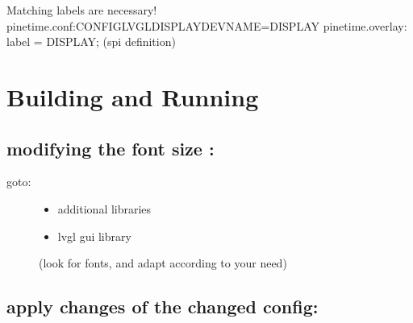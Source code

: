 \documentclass[letterpaper,10pt,english]{sphinxmanual}
\begin{document}

\begin{sphinxVerbatim}[commandchars=\\\{\}]
Matching labels are necessary!
pinetime.conf:CONFIG\PYGZus{}LVGL\PYGZus{}DISPLAY\PYGZus{}DEV\PYGZus{}NAME=\PYGZdq{}DISPLAY\PYGZdq{}
pinetime.overlay:               label = \PYGZdq{}DISPLAY\PYGZdq{}; (spi definition)
\end{sphinxVerbatim}


\section{Building and Running}
\label{\detokenize{lvgl:building-and-running}}
\begin{sphinxVerbatim}[commandchars=\\\{\}]
\end{sphinxVerbatim}


\subsection{modifying the font size :}
\label{\detokenize{lvgl:modifying-the-font-size}}
\begin{sphinxVerbatim}[commandchars=\\\{\}]
\end{sphinxVerbatim}
\begin{description}
\item[{goto:}] \leavevmode\begin{itemize}
\item {} 
additional libraries

\item {} 
lvgl gui library

\end{itemize}

(look for fonts, and adapt according to your need)

\end{description}


\subsection{apply changes of the changed config:}
\label{\detokenize{lvgl:apply-changes-of-the-changed-config}}
\begin{sphinxVerbatim}[commandchars=\\\{\}]
\end{sphinxVerbatim}
\end{document}
